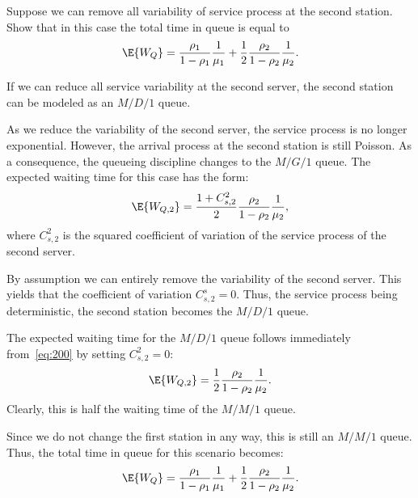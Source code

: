 \begin{exercise}
Suppose we can remove all variability of service process at the second station. Show that  in this case  the total time in queue is equal to
\begin{equation*}
  \E{W_Q}= \frac{\rho_1}{1-\rho_1} \frac1{\mu_1} +
  \frac12\frac{\rho_2}{1-\rho_2} \frac1{\mu_2}.
\end{equation*}
\begin{hint}
  If we can reduce all service variability at the second server, the second station can be modeled as an $M/D/1$ queue.
\end{hint}
\begin{solution}
As we reduce the variability of the second server, the service process
is no longer exponential. However, the arrival process at the second
station is still Poisson. As a consequence, the queueing discipline
changes to the $M/G/1$ queue. The expected waiting time for this case
has the form:
\begin{equation}\label{eq:200}
\E{W_{Q,2}} = \frac{1+C_{s,2}^2}2\frac{\rho_2}{1-\rho_2} \frac1{\mu_2},
\end{equation}
where $C_{s,2}^2$ is the squared coefficient of variation of the
service process of the second server.

By assumption we can entirely remove the variability of the second server.
This yields that the coefficient of variation $C_{s,2}^s = 0$.
Thus, the service process being deterministic, the second station becomes the $M/D/1$ queue.

The expected waiting time for the $M/D/1$ queue follows immediately
from~\cref{eq:200} by setting $C_{s,2}^2 =0$:
\begin{equation}\label{eq:300}
\E{W_{Q,2}} = \frac{1}2\frac{\rho_2}{1-\rho_2} \frac1{\mu_2}.
\end{equation}
Clearly, this is half the waiting time of the  $M/M/1$ queue. 

Since we do not change the first station in any way, this is still an
$M/M/1$ queue. 
Thus, the total time in queue for this scenario becomes:
\begin{equation*}
  \E{W_Q}= \frac{\rho_1}{1-\rho_1} \frac1{\mu_1} +
  \frac12\frac{\rho_2}{1-\rho_2} \frac1{\mu_2}. 
\end{equation*}
\end{solution}
\end{exercise}

